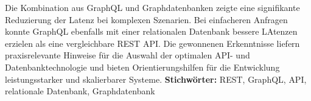 \newline
\noindent
Die Kombination aus GraphQL und Graphdatenbanken zeigte eine signifikante Reduzierung der Latenz bei komplexen Szenarien. Bei einfacheren Anfragen konnte GraphQL ebenfalls mit einer relationalen Datenbank bessere LAtenzen erzielen als eine vergleichbare REST API. Die gewonnenen Erkenntnisse liefern praxisrelevante Hinweise für die Auswahl der optimalen API- und Datenbanktechnologie und bieten Orientierungshilfen für die Entwicklung leistungsstarker und skalierbarer Systeme.
\newline
\noindent
\textbf{Stichwörter:} REST, GraphQL, API, relationale Datenbank, Graphdatenbank
